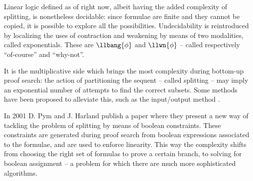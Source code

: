 Linear logic defined as of right now, albeit having the added complexity of splitting, is nonetheless decidable: since formulae are finite and they cannot be copied, it is possible to explore all the possibilities.
Undecidability is reintroduced by localizing the uses of contraction and weakening by means of two modalities, called exponentials.
These are  $\llbang{\phi}$ and $\llwn{\phi}$ -- called respectively ``of-course'' and ``why-not''.



It is the multiplicative side which brings the most complexity during bottom-up proof search: the action of partitioning the sequent -- called splitting -- may imply an exponential number of attempts to find the correct subsets.
Some methods have been proposed to alleviate this, such as the input/output method \cite{IO}.

In 2001 D. Pym and J. Harland publish a paper \cite{HarlandPym} where they present a new way of tackling the problem of splitting by means of boolean constraints.
These constraints are generated during proof search from boolean expressions associated to the formulae, and are used to enforce linearity.
This way the complexity shifts from choosing the right set of formulas to prove a certain branch, to solving for boolean assignment -- a problem for which there are much more sophisticated algorithms.


